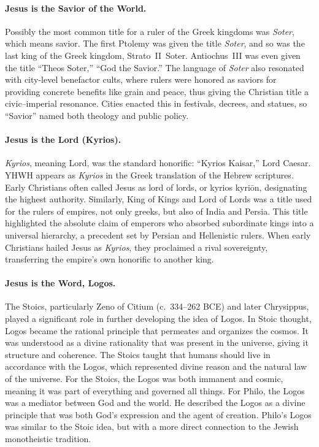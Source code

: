 \paragraph{Jesus is the Savior of the World.}\label{par:jesus-is-the-savior-of-the-world.}
Possibly the most common title for a ruler of the Greek kingdoms was \emph{Soter}, which means savior.
The first Ptolemy was given the title \emph{Soter}, and so was the last king of the Greek kingdom, Strato~II~Soter.
Antiochus~III was even given the title “Theos Soter,” “God the Savior.”
The language of \emph{Soter} also resonated with city-level benefactor cults, where rulers were honored as saviors for providing concrete benefits like grain and peace, thus giving the Christian title a civic–imperial resonance.
Cities enacted this in festivals, decrees, and statues, so “Savior” named both theology and public policy.

\paragraph{Jesus is the Lord (Kyrios).}\label{par:jesus-is-the-lord-kyrios}
\emph{Kyrios}, meaning Lord, was the standard honorific: “Kyrios Kaisar,” Lord Caesar.
YHWH appears as \emph{Kyrios} in the Greek translation of the Hebrew scriptures.
Early Christians often called Jesus as lord of lords, or kyrios kyriōn, designating the highest authority.
Similarly, King of Kings and Lord of Lords was a title used for the rulers of empires, not only greeks, but also of India and Persia.
This title highlighted the absolute claim of emperors who absorbed subordinate kings into a universal hierarchy, a precedent set by Persian and Hellenistic rulers.
When early Christians hailed Jesus as \emph{Kyrios}, they proclaimed a rival sovereignty, transferring the empire’s own honorific to another king.

\paragraph{Jesus is the Word, Logos.}\label{par:jesus-is-the-word.}
The Stoics, particularly Zeno of Citium (c.~334–262 BCE) and later Chrysippus, played a significant role in further developing the idea of Logos.
In Stoic thought, Logos became the rational principle that permeates and organizes the cosmos.
It was understood as a divine rationality that was present in the universe, giving it structure and coherence.
The Stoics taught that humans should live in accordance with the Logos, which represented divine reason and the natural law of the universe.
For the Stoics, the Logos was both immanent and cosmic, meaning it was part of everything and governed all things.
For Philo, the Logos was a mediator between God and the world.
He described the Logos as a divine principle that was both God’s expression and the agent of creation.
Philo’s Logos was similar to the Stoic idea, but with a more direct connection to the Jewish monotheistic tradition.

